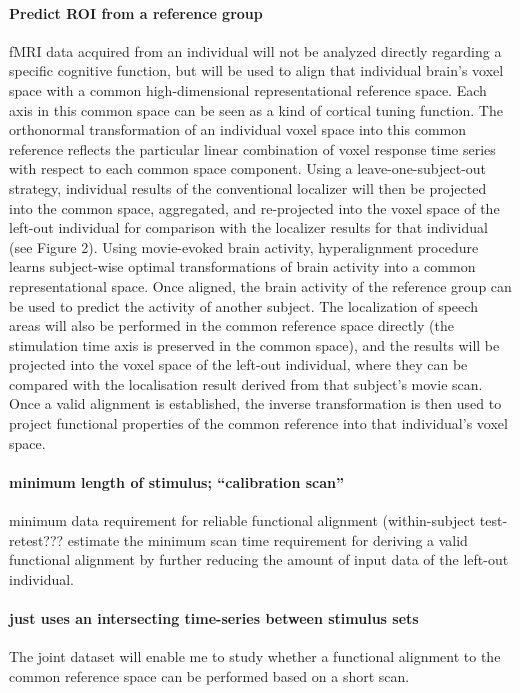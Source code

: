 \paragraph{Predict ROI from a reference group}
%
fMRI data acquired from an individual will not be analyzed directly regarding a
specific cognitive function, but will be used to align that individual brain's
voxel space with a common high-dimensional representational reference space.
%
Each axis in this common space can be seen as a kind of cortical tuning
function.
%
The orthonormal transformation of an individual voxel space into this common
reference reflects the particular linear combination of voxel response time
series with respect to each common space component.
%
Using a leave-one-subject-out strategy, individual results of the conventional
localizer will then be projected into the common space, aggregated, and
re-projected into the voxel space of the left-out individual for comparison with
the localizer results for that individual (see Figure 2).
%
Using movie-evoked brain activity, hyperalignment procedure learns subject-wise
optimal transformations of brain activity into a common representational space.
%
Once aligned, the brain activity of the reference group can be used to predict
the activity of another subject.
%
The localization of speech areas will also be performed in the common reference
space directly (the stimulation time axis is preserved in the common space), and
the results will be projected into the voxel space of the left-out individual,
where they can be compared with the localisation result derived from that
subject’s movie scan.
%
Once a valid alignment is established, the inverse transformation is then used
to project functional properties of the common reference into that individual's
voxel space.


\paragraph{minimum length of stimulus; ``calibration scan''}
%
minimum data requirement for reliable functional alignment (within-subject
test-retest???
%
estimate the minimum scan time requirement for deriving a valid functional
alignment by further reducing the amount of input data of the left-out
individual.
\paragraph{just uses an intersecting time-series between stimulus sets}
%
The joint dataset will enable me to study whether a functional alignment to the
common reference space can be performed based on a short scan.
